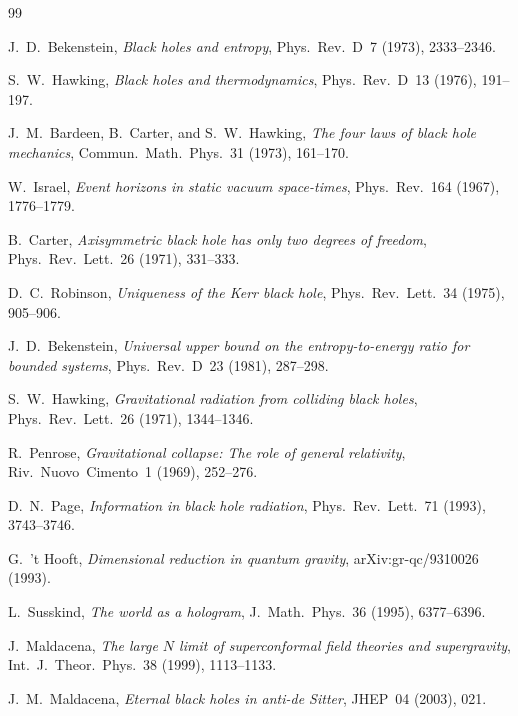 \documentclass[12pt,a4paper]{article}
\theoremstyle{remark}
\begin{document}
\begin{thebibliography}{99}

J.~D.~Bekenstein,
\emph{Black holes and entropy},
Phys.~Rev.~D~7 (1973), 2333--2346.

S.~W.~Hawking,
\emph{Black holes and thermodynamics},
Phys.~Rev.~D~13 (1976), 191--197.

J.~M.~Bardeen, B.~Carter, and S.~W.~Hawking,
\emph{The four laws of black hole mechanics},
Commun.~Math.~Phys.~31 (1973), 161--170.

W.~Israel,
\emph{Event horizons in static vacuum space-times},
Phys.~Rev.~164 (1967), 1776--1779.

B.~Carter,
\emph{Axisymmetric black hole has only two degrees of freedom},
Phys.~Rev.~Lett.~26 (1971), 331--333.

D.~C.~Robinson,
\emph{Uniqueness of the Kerr black hole},
Phys.~Rev.~Lett.~34 (1975), 905--906.

J.~D.~Bekenstein,
\emph{Universal upper bound on the entropy-to-energy ratio for bounded systems},
Phys.~Rev.~D~23 (1981), 287--298.

S.~W.~Hawking,
\emph{Gravitational radiation from colliding black holes},
Phys.~Rev.~Lett.~26 (1971), 1344--1346.

R.~Penrose,
\emph{Gravitational collapse: The role of general relativity},
Riv.~Nuovo~Cimento~1 (1969), 252--276.

D.~N.~Page,
\emph{Information in black hole radiation},
Phys.~Rev.~Lett.~71 (1993), 3743--3746.

G.~'t Hooft,
\emph{Dimensional reduction in quantum gravity},
arXiv:gr-qc/9310026 (1993).

L.~Susskind,
\emph{The world as a hologram},
J.~Math.~Phys.~36 (1995), 6377--6396.

J.~Maldacena,
\emph{The large $N$ limit of superconformal field theories and supergravity},
Int.~J.~Theor.~Phys.~38 (1999), 1113--1133.

J.~M.~Maldacena,
\emph{Eternal black holes in anti-de Sitter},
JHEP~04 (2003), 021.


\end{thebibliography}
\end{document}
